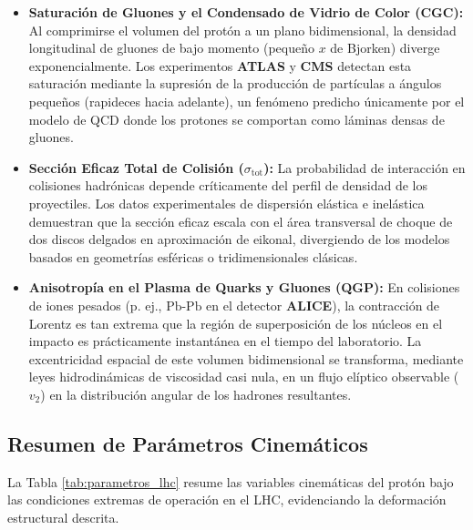 \documentclass[11pt,a4paper]{book}
\begin{document}
\begin{itemize}
    \item \textbf{Saturación de Gluones y el Condensado de Vidrio de Color (CGC):} Al comprimirse el volumen del protón a un plano bidimensional, la densidad longitudinal de gluones de bajo momento (pequeño $x$ de Bjorken) diverge exponencialmente. Los experimentos \textbf{ATLAS} y \textbf{CMS} detectan esta saturación mediante la supresión de la producción de partículas a ángulos pequeños (rapideces hacia adelante), un fenómeno predicho únicamente por el modelo de QCD donde los protones se comportan como láminas densas de gluones.
    
    \item \textbf{Sección Eficaz Total de Colisión ($\sigma_{\text{tot}}$):} La probabilidad de interacción en colisiones hadrónicas depende críticamente del perfil de densidad de los proyectiles. Los datos experimentales de dispersión elástica e inelástica demuestran que la sección eficaz escala con el área transversal de choque de dos discos delgados en aproximación de eikonal, divergiendo de los modelos basados en geometrías esféricas o tridimensionales clásicas.
    
    \item \textbf{Anisotropía en el Plasma de Quarks y Gluones (QGP):} En colisiones de iones pesados (p. ej., $\text{Pb-Pb}$ en el detector \textbf{ALICE}), la contracción de Lorentz es tan extrema que la región de superposición de los núcleos en el impacto es prácticamente instantánea en el tiempo del laboratorio. La excentricidad espacial de este volumen bidimensional se transforma, mediante leyes hidrodinámicas de viscosidad casi nula, en un flujo elíptico observable ($v_2$) en la distribución angular de los hadrones resultantes.
\end{itemize}

\subsection{Resumen de Parámetros Cinemáticos}
La Tabla \ref{tab:parametros_lhc} resume las variables cinemáticas del protón bajo las condiciones extremas de operación en el LHC, evidenciando la deformación estructural descrita.
\end{document}
